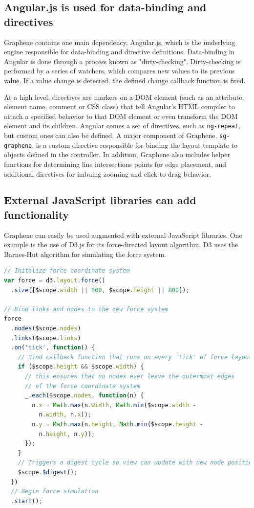 \subsection{Angular.js is used for data-binding and directives}
Graphene contains one main dependency, Angular.js, which is the underlying engine responsible for data-binding and directive definitions.
Data-binding in Angular is done through a process known as "dirty-checking".
Dirty-checking is performed by a series of watchers, which compares new values to its previous value. \autocite{google2014angularScope}
If a value change is detected, the defined change callback function is fired.

At a high level, directives are markers on a DOM element (such as an attribute, element name, comment or CSS class) that tell Angular's HTML compiler to attach a specified behavior to that DOM element or even transform the DOM element and its children. \autocite{google2014angularDirectives, google2014angulardirectives2}
Angular comes a set of directives, such as \texttt{ng-repeat}, but custom ones can also be defined.
A major component of Graphene, \texttt{sg-graphene}, is a custom directive responsible for binding the layout template to objects defined in the controller.
In addition, Graphene also includes helper functions for determining line intersections points for edge placement, and additional directives for imbuing zooming and click-to-drag behavior.

\subsection{External JavaScript libraries can add functionality}
Graphene can easily be used augmented with external JavaScript libraries.
One example is the use of D3.js \autocite{bostock2014d3} for its force-directed layout algorithm.
D3 uses the Barnes-Hut algorithm for simulating the force system. \autocite{bostock2011d3}

\begin{lstlisting}[language=JavaScript]
// Initalize force coordinate system
var force = d3.layout.force()
  .size([$scope.width || 800, $scope.height || 800]);

// Bind links and nodes to the new force system
force
  .nodes($scope.nodes)
  .links($scope.links)
  .on('tick', function() {
    // Bind callback function that runs on every 'tick' of force layout
    if ($scope.height && $scope.width) {
      // this ensures that no nodes ever leave the outermost edges
      // of the force coordinate system
      _.each($scope.nodes, function(n) {
        n.x = Math.max(n.width, Math.min($scope.width -
          n.width, n.x));
        n.y = Math.max(n.height, Math.min($scope.height -
          n.height, n.y));
      });
    }
    // Triggers a digest cycle so view can update with new node positions
    $scope.$digest();
  })
  // Begin force simulation
  .start();
\end{lstlisting}

